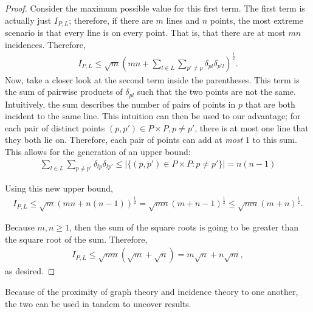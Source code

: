 \documentclass{scrippsthesisclass}
\theoremstyle{definition}
\begin{document}
\begin{proof}
Consider the maximum possible value for this first term. 
The first term is actually just $I_{P,L}$; therefore, if there are $m$ lines and $n$ points, the most extreme scenario is that every line is on every point.
That is, that there are at most $mn$ incidences. 
Therefore, 
\begin{align}
I_{P,L} \leq \sqrt{m} \left(mn + \sum \limits_{l \in L} \sum \limits_{p' \neq p} \delta_{pl} \delta_{p'l} \right)^{\frac{1}{2}}. 
\end{align}
Now, take a closer look at the second term inside the parentheses. 
This term is the sum of pairwise products of $\delta_{pl}$ such that the two points are not the same.
Intuitively, the sum describes the number of pairs of points in $p$ that are both incident to the same line. 
This intuition can then be used to our advantage; for each pair of distinct points $(p, p') \in P \times P, p \neq p'$, there is at most one line that they both lie on. 
Therefore, each pair of points can add at \textit{most} $1$ to this sum. 
This allows for the generation of an upper bound: 
\begin{align}
\sum_{l \in L}\sum_{p \neq p'} \delta_{lp}\delta_{lp'} \leq \left| \{(p, p') \in P \times P: p \neq p'\}\right| = n(n-1)
\end{align}

Using this new upper bound, 
\begin{align}
I_{P,L} \leq \sqrt{m} (mn + n(n-1))^{\frac{1}{2}}
 = \sqrt{mn} (m + n - 1 )^{\frac{1}{2}} \leq \sqrt{mn} (m + n)^{\frac{1}{2}}. 
\end{align}

Because $m, n \geq 1$, then the sum of the square roots is going to be greater than the square root of the sum.
Therefore, 
\begin{align}
I_{P, L} \leq \sqrt{mn}(\sqrt{m} + \sqrt{n}) = m \sqrt{n} + n \sqrt{m}, 
\end{align}
as desired. 
\end{proof}

Because of the proximity of graph theory and incidence theory to one another, the two can be used in tandem to uncover results. 
\end{document}
